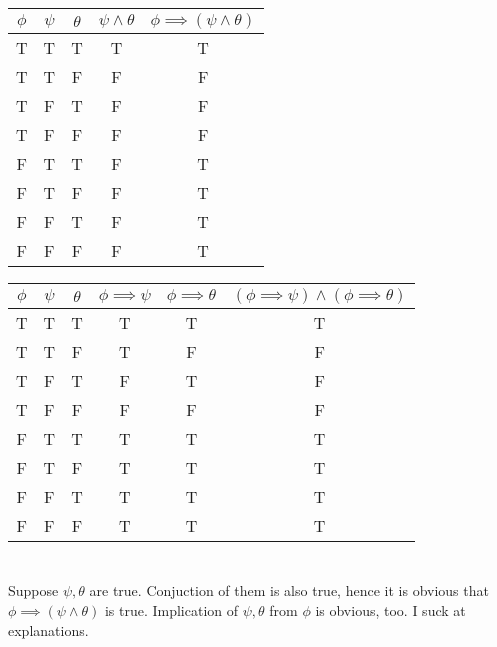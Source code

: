 \documentclass{article}
\begin{document}
\section{}

\begin{tabular}{ | c | c | c | c | c | }
  \hline
  $\phi$ & $\psi$ & $\theta$ & $\psi \wedge \theta$ & $\phi \implies (\psi \wedge \theta)$ \\
  \hline
  T & T & T & T & T \\
  T & T & F & F & F \\
  T & F & T & F & F \\
  T & F & F & F & F \\
  F & T & T & F & T \\
  F & T & F & F & T \\
  F & F & T & F & T \\
  F & F & F & F & T \\
  \hline
\end{tabular}
\quad
\begin{tabular}{ | c | c | c | c | c | c | }
  \hline
  $\phi$ & $\psi$ & $\theta$ & $\phi \implies \psi$ & $\phi \implies \theta$ & $(\phi \implies \psi) \wedge (\phi \implies \theta)$ \\
  \hline
  T & T & T & T & T & T \\
  T & T & F & T & F & F \\
  T & F & T & F & T & F \\
  T & F & F & F & F & F \\
  F & T & T & T & T & T \\
  F & T & F & T & T & T \\
  F & F & T & T & T & T \\
  F & F & F & T & T & T \\
  \hline
\end{tabular}

\section{}

Suppose $\psi, \theta$ are true. Conjuction of them is also true, hence it is
obvious that $\phi \implies (\psi \wedge \theta)$ is true. Implication of $\psi,
\theta$ from $\phi$ is obvious, too. I suck at explanations.
\end{document}
